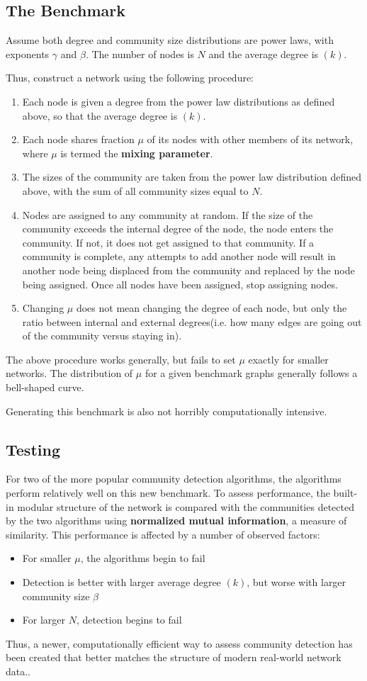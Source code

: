 \documentclass{article}
\begin{document}
\subsection{The Benchmark}

Assume both degree and community size distributions are power laws, with exponents $\gamma$ and $\beta$. The number of nodes is $N$ and the average degree is $(k)$.

Thus, construct a network using the following procedure:
\begin{enumerate}
\item Each node is given a degree from the power law distributions as defined above, so that the average degree is $(k)$.
\item Each node shares fraction $\mu$ of its nodes with other members of its network, where $\mu$ is termed the \textbf{mixing parameter}.
\item The sizes of the community are taken from the power law distribution defined above, with the sum of all community sizes equal to $N$. 
\item Nodes are assigned to any community at random. If the size of the community exceeds the internal degree of the node, the node enters the community. If not, it does not get assigned to that community. If a community is complete, any attempts to add another node will result in another node being displaced from the community and replaced by the node being assigned. Once all nodes have been assigned, stop assigning nodes.
\item Changing $\mu$ does not mean changing the degree of each node, but only the ratio between internal and external degrees(i.e. how many edges are going out of the community versus staying in).
\end{enumerate}
The above procedure works generally, but fails to set $\mu$ exactly for smaller networks. The distribution of $\mu$ for a given benchmark graphs generally follows a bell-shaped curve. 

Generating this benchmark is also not horribly computationally intensive.
\subsection{Testing}

For two of the more popular community detection algorithms, the algorithms perform relatively well on this new benchmark. To assess performance, the built-in modular structure of the network is compared with the communities detected by the two algorithms using \textbf{normalized mutual information}, a measure of similarity. This performance is affected by a number of observed factors:
\begin{itemize}
\item For smaller $\mu$, the algorithms begin to fail
\item Detection is better with larger average degree $(k)$, but worse with larger community size $\beta$
\item For larger $N$, detection begins to fail  
\end{itemize}
Thus, a newer, computationally efficient way to assess community detection has been created that better matches the structure of modern real-world network data..
\end{document}
